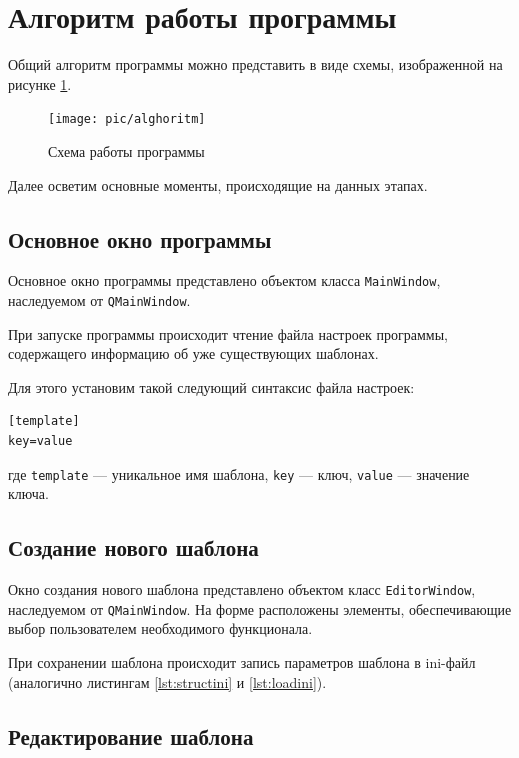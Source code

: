 \section{Алгоритм работы программы}

Общий алгоритм программы можно представить в виде схемы, изображенной на рисунке \ref{fig:alghoritm}.

\begin{figure}[h!]
	\centering
	\texttt{[image: pic/alghoritm]}
	\caption{Схема работы программы}
	\label{fig:alghoritm}
\end{figure}

Далее осветим основные моменты, происходящие на данных этапах.

\subsection{Основное окно программы}

Основное окно программы представлено объектом класса \texttt{MainWindow}, наследуемом от \texttt{QMainWindow}\cite{qt:shlee}.

При запуске программы происходит чтение файла настроек программы, содержащего информацию об уже существующих шаблонах.

Для этого установим такой следующий синтаксис файла настроек:
\begin{lstlisting}[label=lst:structini,caption=Синтаксис файла настроек]
[template]
key=value
\end{lstlisting}
где \texttt{template} --- уникальное имя шаблона, \texttt{key} --- ключ, \texttt{value} --- значение ключа.



\subsection{Создание нового шаблона}

Окно создания нового шаблона представлено объектом класс \texttt{EditorWindow}, наследуемом от \texttt{QMainWindow}. На форме расположены элементы, обеспечивающие выбор пользователем необходимого функционала.

При сохранении шаблона происходит запись параметров шаблона в ini-файл (аналогично листингам \ref{lst:structini} и \ref{lst:loadini}).


\subsection{Редактирование шаблона}

